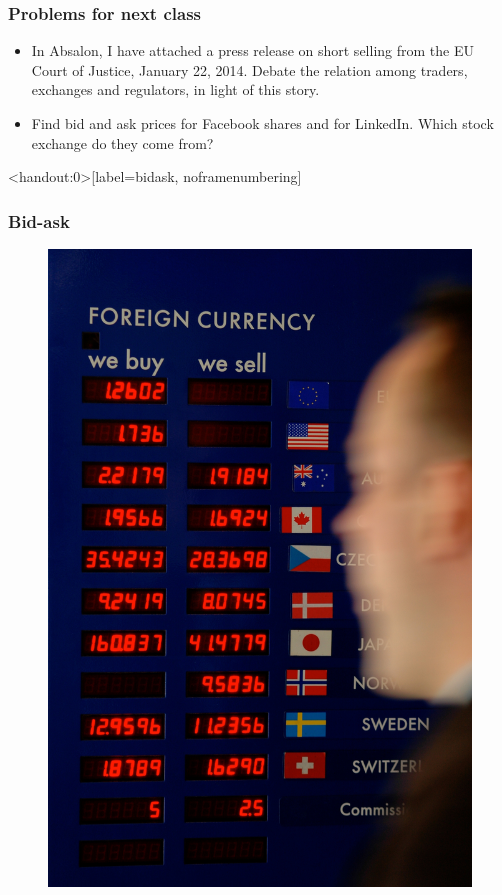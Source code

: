 \documentclass[english,10pt]{beamer}
\theoremstyle{definition}
\begin{document}
\begin{frame}
\frametitle{Problems for next class}

\begin{itemize}
\item In Absalon, I have attached a press release on short selling from the EU Court of Justice, January 22, 2014. Debate the relation among traders, exchanges and regulators, in light of this story.

\item Find bid and ask prices for Facebook shares and for LinkedIn. Which stock exchange do they come from? 
\end{itemize}


\end{frame}


\begin{frame}<handout:0>[label=bidask, noframenumbering]
\frametitle{Bid-ask}
\begin{figure}
\includegraphics[width=.3\paperwidth]{pics/Image_XRates}
\end{figure}

\hyperlink{main2}{}
\end{frame}
\end{document}
